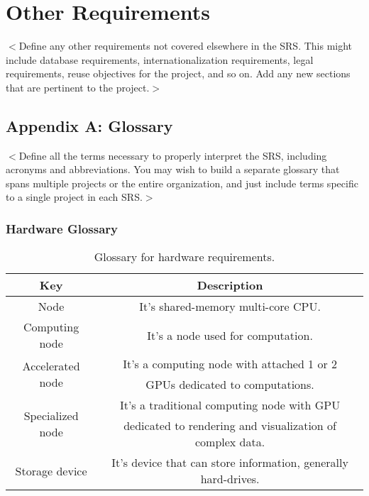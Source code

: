 \documentclass{report}
\begin{document}


\chapter{Other Requirements}
$<$Define any other requirements not covered elsewhere in the SRS. This might 
include database requirements, internationalization requirements, legal 
requirements, reuse objectives for the project, and so on. Add any new sections 
that are pertinent to the project.$>$

\section{Appendix A: Glossary}
$<$Define all the terms necessary to properly interpret the SRS, including 
acronyms and abbreviations. You may wish to build a separate glossary that spans 
multiple projects or the entire organization, and just include terms specific to 
a single project in each SRS.$>$

\subsection{Hardware Glossary} \label{app:glossary:hardware}
	\begin{table}[!htbp]
		\centering
		\caption{Glossary for hardware requirements.}
		\label{tab:hardware_requirements_glossary}
		\begin{tabular}{|c|c|}
			\hline
			\textbf{Key} & \textbf{Description} \\ \hline \hline
			Node & It's shared-memory multi-core CPU.\\ \hline
			Computing node & It's a node used for computation. \\ \hline
			\multirow{2}{*}{Accelerated node} &  It's a computing node with attached 1 or 2 \\ & GPUs dedicated to computations.\\ \hline
			\multirow{2}{*}{Specialized node} & It's a traditional computing node with GPU \\& dedicated to rendering and visualization of complex data. \\ \hline \hline
			Storage device & It's device that can store information, generally hard-drives. \\ \hline
		\end{tabular}
	\end{table}
\clearpage
\end{document}
